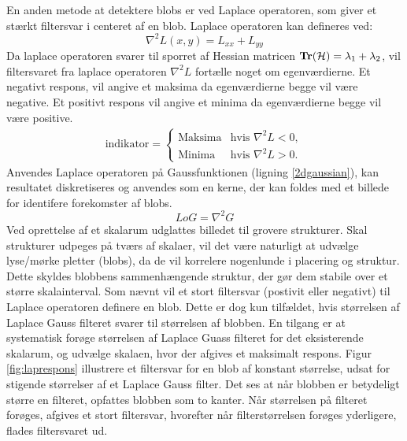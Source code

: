        \vspace{-2.7em}
\noindent
En anden metode at detektere blobs er ved Laplace operatoren, som giver et stærkt filtersvar i centeret af en blob. Laplace operatoren kan defineres ved:
$$
\nabla^2L(x,y) = L_{xx}+L_{yy}
$$
Da laplace operatoren svarer til sporret af Hessian matricen $\bold{Tr}(\mathcal{H}) = \lambda_1 + \lambda_2$, vil filtersvaret fra laplace operatoren $\nabla^2L$ fortælle noget om egenværdierne. Et negativt respons, vil angive et maksima da egenværdierne begge vil være negative. Et positivt respons vil angive et minima da egenværdierne begge vil være positive.
\begin{equation}
\begin{split}
\text{indikator} = 
\begin{cases}
\text{Maksima}& \text{hvis } \nabla^2L < 0,  \\
\text{Minima} & \text{hvis } \nabla^2L > 0.
\end{cases}
\end{split}
\label{laplaceblob}
\end{equation}
Anvendes Laplace operatoren på Gaussfunktionen (ligning \eqref{2dgaussian}), kan resultatet diskretiseres og anvendes som en kerne, der kan foldes med et billede for identifere forekomster af blobs.
\begin{equation}
LoG= \nabla^2 G
\label{lap}
\end{equation}
Ved oprettelse af et skalarum udglattes billedet til grovere strukturer. 
Skal strukturer udpeges på tværs af skalaer, vil det være naturligt at udvælge lyse/mørke pletter (blobs), da de vil korrelere nogenlunde i placering og struktur. Dette skyldes blobbens sammenhængende struktur, der gør dem stabile over et større skalainterval. Som nævnt vil et stort filtersvar (postivit eller negativt) til Laplace operatoren definere en blob. Dette er dog kun tilfældet, hvis størrelsen af Laplace Gauss filteret svarer til størrelsen af blobben. En tilgang er at systematisk forøge størrelsen af Laplace Guass filteret for det eksisterende skalarum, og udvælge skalaen, hvor der afgives et maksimalt respons. Figur \ref{fig:laprespons} illustrere et filtersvar for en blob af konstant størrelse, udsat for stigende størrelser af et Laplace Gauss filter. Det ses at når blobben er betydeligt større en filteret, opfattes blobben som to kanter. Når størrelsen på filteret forøges, afgives et stort filtersvar, hvorefter når filterstørrelsen forøges yderligere, flades filtersvaret ud.
